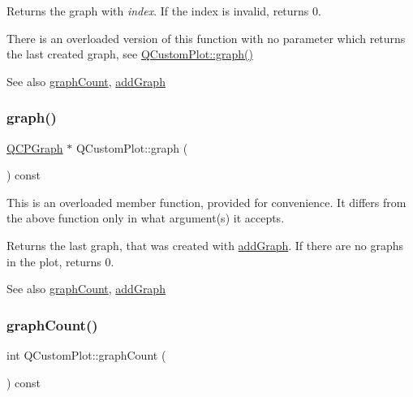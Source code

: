 Returns the graph with {\itshape index}. If the index is invalid, returns 0.

There is an overloaded version of this function with no parameter which returns the last created graph, see \hyperlink{classQCustomPlot_a6ecae130f684b25276fb47bd3a5875c6}{Q\+Custom\+Plot\+::graph()}

\begin{DoxySeeAlso}{See also}
\hyperlink{classQCustomPlot_a5e1787cdde868c4d3790f9ebc8207d90}{graph\+Count}, \hyperlink{classQCustomPlot_a6fb2873d35a8a8089842d81a70a54167}{add\+Graph} 
\end{DoxySeeAlso}
\mbox{\label{classQCustomPlot_aac190865a67f19af3fdf2136774997af}} 
\subsubsection{\texorpdfstring{graph()}{graph()}\hspace{0.1cm}{\footnotesize\ttfamily [2/2]}}
{\footnotesize\ttfamily \hyperlink{classQCPGraph}{Q\+C\+P\+Graph} $\ast$ Q\+Custom\+Plot\+::graph (\begin{DoxyParamCaption}{ }\end{DoxyParamCaption}) const}

This is an overloaded member function, provided for convenience. It differs from the above function only in what argument(s) it accepts.

Returns the last graph, that was created with \hyperlink{classQCustomPlot_a6fb2873d35a8a8089842d81a70a54167}{add\+Graph}. If there are no graphs in the plot, returns 0.

\begin{DoxySeeAlso}{See also}
\hyperlink{classQCustomPlot_a5e1787cdde868c4d3790f9ebc8207d90}{graph\+Count}, \hyperlink{classQCustomPlot_a6fb2873d35a8a8089842d81a70a54167}{add\+Graph} 
\end{DoxySeeAlso}
\mbox{\label{classQCustomPlot_a5e1787cdde868c4d3790f9ebc8207d90}} 
\subsubsection{\texorpdfstring{graph\+Count()}{graphCount()}}
{\footnotesize\ttfamily int Q\+Custom\+Plot\+::graph\+Count (\begin{DoxyParamCaption}{ }\end{DoxyParamCaption}) const}

